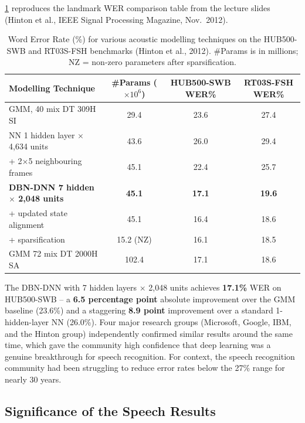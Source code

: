 \documentclass[12pt,a4paper]{article}
\begin{document}
\cref{tab:wer-results} reproduces the landmark WER comparison table from the
lecture slides (Hinton et al., IEEE Signal Processing Magazine, Nov.\ 2012).

\begin{table}[ht]
\centering
\caption{Word Error Rate (\%) for various acoustic modelling techniques on the
HUB500-SWB and RT03S-FSH benchmarks (Hinton et al., 2012).
\#Params is in millions; NZ = non-zero parameters after sparsification.}
\label{tab:wer-results}
\begin{tabular}{lccc}
\toprule
\textbf{Modelling Technique} & \textbf{\#Params ($\times 10^6$)} &
\textbf{HUB500-SWB WER\%} & \textbf{RT03S-FSH WER\%} \\
\midrule
GMM, 40 mix DT 309H SI & 29.4 & 23.6 & 27.4 \\
NN 1 hidden layer $\times$ 4,634 units & 43.6 & 26.0 & 29.4 \\
+ 2$\times$5 neighbouring frames & 45.1 & 22.4 & 25.7 \\
\textbf{DBN-DNN 7 hidden $\times$ 2,048 units} & \textbf{45.1} & \textbf{17.1} & \textbf{19.6} \\
+ updated state alignment & 45.1 & 16.4 & 18.6 \\
+ sparsification & 15.2 (NZ) & 16.1 & 18.5 \\
\midrule
GMM 72 mix DT 2000H SA & 102.4 & 17.1 & 18.6 \\
\bottomrule
\end{tabular}
\end{table}

\begin{keyinsight}[title=The Speech Recognition Breakthrough]
  The DBN-DNN with 7 hidden layers $\times$ 2,048 units achieves \textbf{17.1\%}
  WER on HUB500-SWB -- a \textbf{6.5 percentage point} absolute improvement
  over the GMM baseline (23.6\%) and a staggering \textbf{8.9 point}
  improvement over a standard 1-hidden-layer NN (26.0\%).
  Four major research groups (Microsoft, Google, IBM, and the Hinton group)
  independently confirmed similar results around the same time, which gave the
  community high confidence that deep learning was a genuine breakthrough for
  speech recognition.
  For context, the speech recognition community had been struggling to reduce
  error rates below the 27\% range for nearly 30 years.
\end{keyinsight}

\subsection{Significance of the Speech Results}
\end{document}
